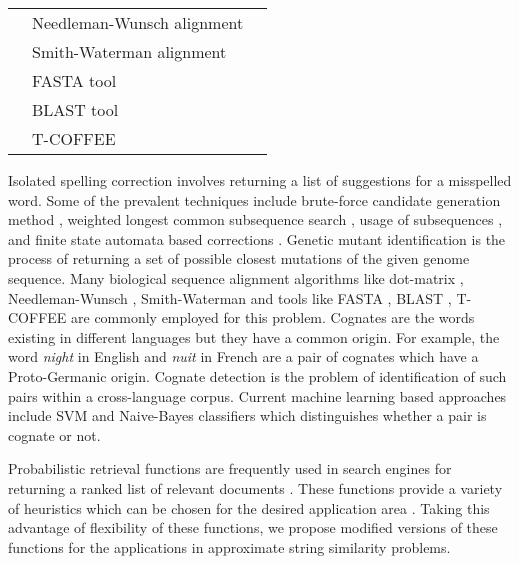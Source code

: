 \begin{table}[h]
{\begin{tabular}{|l|l|l|}
			& Needleman-Wunsch alignment                 & \cite{needleman1970general}                                                                       \\ \cline{2-3} 
			& Smith-Waterman alignment                   & \cite{smith1981identification}                                                                    \\ \cline{2-3} 
			& FASTA tool                                 & \cite{pearson19905}                                                                               \\ \cline{2-3} 
			& BLAST tool                                 & \cite{kent2002blat}                                                                               \\ \cline{2-3} 
			& T-COFFEE                                   & \cite{notredame2000t}                                                                             \\ \hline
		\end{tabular}%
	}
\end{table}

Isolated spelling correction involves returning a list of suggestions for a misspelled word.
Some of the prevalent techniques include brute-force candidate generation method \cite{norvig2007write}, weighted longest common subsequence search \cite{islam2009real}, usage of subsequences \cite{jarvelin2007s,keskustalo2003non}, and finite state automata based corrections \cite{pirinen2010finite}.
Genetic mutant identification is the process of returning a set of possible closest mutations of the given genome sequence.
Many biological sequence alignment algorithms like dot-matrix \cite{huang2004rapid}, Needleman-Wunsch \cite{needleman1970general}, Smith-Waterman \cite{smith1981identification} and tools like FASTA \cite{pearson19905}, BLAST \cite{kent2002blat}, T-COFFEE \cite{notredame2000t} are commonly employed for this problem.
Cognates are the words existing in different languages but they have a common origin.
For example, the word \textit{night} in English and \textit{nuit} in French are a pair of cognates which have a Proto-Germanic origin.
Cognate detection is the problem of identification of such pairs within a cross-language corpus.
Current machine learning based approaches include SVM and Naive-Bayes classifiers which distinguishes whether a pair is cognate or not. \cite{kondrak2006evaluation,inkpen2005automatic,ciobanu2014building,rama2015automatic}

Probabilistic retrieval functions are frequently used in search engines for returning a ranked list of relevant documents \cite{zhai2016text}. 
These functions provide a variety of heuristics which can be chosen for the desired application area \cite{Fang}.
Taking this advantage of flexibility of these functions, we propose modified versions of these functions for the applications in approximate string similarity problems.


